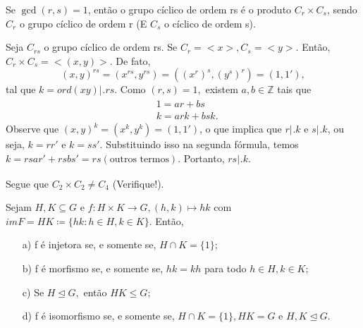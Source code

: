 \documentclass[Algebra/algebra_notes.tex]{subfiles}
\begin{document}
\begin{prop*}
	Se $\gcd{(r, s)} = 1$, então o grupo cíclico de ordem rs é o produto $C_{r}\times{C_{s}}$, sendo $C_{r}$ o grupo
	cíclico de ordem r (E $C_{s}$ o cíclico de ordem s).
\end{prop*}
\begin{proof*}
	Seja $C_{rs}$ o grupo cíclico de ordem rs. Se $C_{r}=<x>, C_{s} = <y>.$ Então, $C_{r}\times{C_{s}} = <(x, y)>.$ De fato,
	$$
		(x, y)^{rs} = (x^{rs}, y^{rs}) = ((x^{r})^{s}, (y^{s})^{r}) = (1, 1'),
	$$
	tal que $k = ord(xy)\biggl|_{}^{}\biggr.rs.$ Como $(r, s) = 1,$ existem $a, b\in \mathbb{Z}$ tais que
	\begin{align*}
		 & 1 = ar + bs    \\
		 & k = ark + bsk.
	\end{align*}
	Observe que $(x, y)^{k} = (x^{k}, y^{k}) = (1, 1')$, o que implica que $r \biggl|_{}^{}\biggr.k$ e $s \biggl|_{}^{}\biggr.k$, ou seja,
	$k = rr'$ e $k = ss'.$ Substituindo isso na segunda fórmula, temos $k = rsar' + rsbs' = rs(\text{outros termos})$. Portanto,
	$rs \biggl|_{}^{}\biggr.k.$ \qedsymbol
\end{proof*}
\begin{example*}
	Segue que $C_{2}\times C_{2}\neq C_{4}$ (Verifique!).
\end{example*}
\begin{prop*}
	Sejam $H, K \subseteq{G}$ e $f:H\times{K}\rightarrow G, (h,k)\mapsto hk$ com $im F = HK\coloneqq\{hk: h\in H, k\in K\}.$ Então,
	\begin{itemize}
		\item[a)] f é injetora se, e somente se, $H\cap{K} = \{1\};$
		\item[b)] f é morfismo se, e somente se, $hk=kh$ para todo $h\in H, k\in K;$
		\item[c)] Se $H\trianglelefteq{G},$ então $HK\leq{G};$
		\item[d)] f é isomorfismo se, e somente se, $H\cap{K}=\{1\}, HK = G\text{ e }H, K\trianglelefteq{G}.$
	\end{itemize}
\end{prop*}
\end{document}
